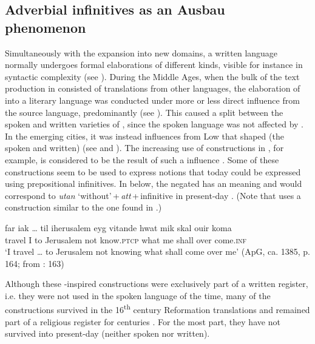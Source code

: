 \documentclass[output=paper]{langscibook}
\begin{document}
\subsection{Adverbial infinitives as an Ausbau phenomenon}\label{sec:kalm:5.2}


Simultaneously with the expansion into new domains, a written language normally undergoes formal elaborations of different kinds, visible for instance in syntactic complexity (see \cites[38--39]{Fischer2007}[]{Kloss1967}). During the Middle Ages, when the bulk of the text production in  consisted of translations from other languages, the elaboration of  into a literary language was conducted under more or less direct influence from the source language, predominantly  (see \citealt{Wollin1981,Wollin1983,Hoder2009, Hoder2010}). This caused a split between the spoken and written varieties of , since the spoken language was not affected by . In the emerging cities, it was instead influences from Low  that shaped (the spoken and written)  (see  and ). The increasing use of  constructions in , for example, is considered to be the result of such a  influence \citep{Ahlberg1942,Hoder2010}. Some of these  constructions seem to be used to express  notions that today could be expressed using prepositional infinitives. In  below, the negated  has an  meaning and would correspond to \textit{utan} ‘without’\,+\,\textit{att}\,+\,infinitive in present-day . (Note that  uses a construction similar to the one found in .)


\ea 
\label{ex:kalm:33}
 \gll far {iak …} til iherusalem eyg vitande hwat mik skal ouir koma\\ 
travel I to Jerusalem not know.\textsc{ptcp} what me shall over come.\textsc{inf}\\
 \glt ‘I travel … to Jerusalem not knowing what shall come over me’ (ApG, ca. 1385, p. 164; from \citealt{Ahlberg1942}: 163)
\z


Although these -inspired constructions were exclusively part of a written register, i.e. they were not used in the spoken language of the time, many of the  constructions survived in the 16\textsuperscript{th} century Reformation  translations and remained part of a religious register for centuries \citep[17–19]{Stahle1970}. For the most part, they have not survived into present-day  (neither spoken nor written). 
\end{document}
